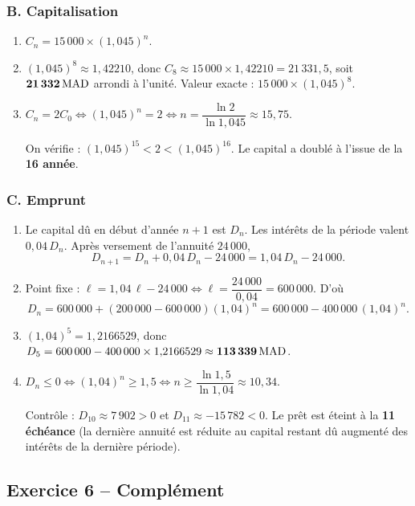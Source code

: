 \documentclass[11pt,a4paper]{article}
\begin{document}
\subsubsection*{B. Capitalisation}

\begin{enumerate}
  \item $C_n = 15\,000 \times (1{,}045)^n$.
  \item $(1{,}045)^8 \approx 1{,}42210$, donc $C_8 \approx 15\,000 \times 1{,}42210 = 21\,331{,}5$, soit $\mathbf{21\,332\,\mathrm{MAD}}$ arrondi à l'unité. Valeur exacte : $15\,000\times (1{,}045)^8$.
  \item $C_n = 2C_0 \iff (1{,}045)^n = 2 \iff n = \dfrac{\ln 2}{\ln 1{,}045} \approx 15{,}75$.

  On vérifie : $(1{,}045)^{15}<2<(1{,}045)^{16}$. Le capital a doublé à l'issue de la \textbf{16 année}.
\end{enumerate}

\subsubsection*{C. Emprunt}

\begin{enumerate}
  \item Le capital dû en début d'année $n+1$ est $D_n$. Les intérêts de la période valent $0{,}04\, D_n$. Après versement de l'annuité $24\,000$,
  \[
  D_{n+1} = D_n + 0{,}04\, D_n - 24\,000 = 1{,}04\, D_n - 24\,000.
  \]
  \item Point fixe : $\ell = 1{,}04\,\ell - 24\,000 \iff \ell = \dfrac{24\,000}{0{,}04} = 600\,000$. D'où
  \[
  D_n = 600\,000 + (200\,000-600\,000)(1{,}04)^n = 600\,000 - 400\,000\,(1{,}04)^n.
  \]
  \item $(1{,}04)^5 = 1{,}2166529$, donc $D_5 = 600\,000 - 400\,000\times 1{,}2166529 \approx \mathbf{113\,339\,\mathrm{MAD}}$.
  \item $D_n\leq 0 \iff (1{,}04)^n \geq 1{,}5 \iff n \geq \dfrac{\ln 1{,}5}{\ln 1{,}04}\approx 10{,}34$.

  Contrôle : $D_{10}\approx 7\,902 > 0$ et $D_{11}\approx -15\,782 < 0$. Le prêt est éteint à la \textbf{11 échéance} (la dernière annuité est réduite au capital restant dû augmenté des intérêts de la dernière période).
\end{enumerate}

\subsection{Exercice 6 -- Complément}
\end{document}
